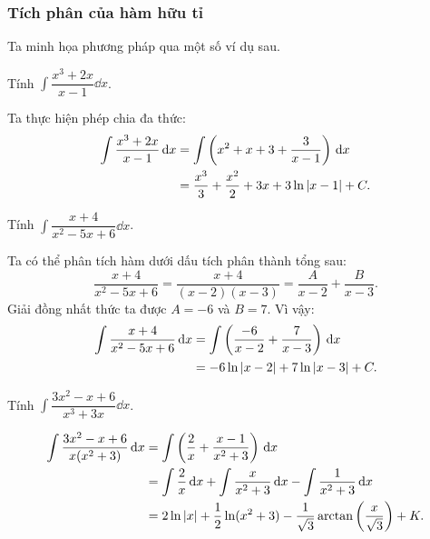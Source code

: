 \subsubsection{Tích phân của hàm hữu tỉ}
Ta minh họa phương pháp qua một số ví dụ sau.

\begin{example}
    Tính $\int \dfrac{x^3+2x}{x-1} \dd x$.
\end{example}
\begin{solution}
    Ta thực hiện phép chia đa thức:
    \begin{align*}
        \int \dfrac{x^3+2x}{x-1} \,\mathrm{d} x &= \int \left(x^2 + x + 3 + \dfrac{3}{x-1}\right) \,\mathrm{d} x \\
        &= \dfrac{x^3}{3} + \dfrac{x^2}{2} + 3x + 3\ln\left\lvert x-1 \right\rvert + C.
    \end{align*}
\end{solution}

\begin{example}
    Tính $\int \dfrac{x+4}{x^2 - 5x + 6} \dd x$.
\end{example}
\begin{solution}
    Ta có thể phân tích hàm dưới dấu tích phân thành tổng sau:
    \[
        \dfrac{x+4}{x^2 - 5x + 6} = \dfrac{x+4}{(x-2)(x-3)} = \dfrac{A}{x-2} + \dfrac{B}{x-3}.
    \]
    Giải đồng nhất thức ta được $A = -6$ và $B = 7$. Vì vậy:
    \begin{align*}
        \int \dfrac{x+4}{x^2 - 5x + 6} \,\mathrm{d} x &= \int \left( \dfrac{-6}{x-2} + \dfrac{7}{x-3} \right) \,\mathrm{d} x \\
        &= -6\ln\left\lvert x-2 \right\rvert + 7\ln\left\lvert x-3 \right\rvert + C.
    \end{align*}
\end{solution}

\begin{example}
    Tính $\int \dfrac{3x^2-x+6}{x^3+3x} \dd x$.
\end{example}
\begin{solution}
    \begin{align*}
        \int \dfrac{3x^2-x+6}{x(x^2+3)} \,\mathrm{d} x &= \int \left( \dfrac{2}{x} + \dfrac{x-1}{x^2+3} \right) \,\mathrm{d} x \\
        &= \int \dfrac{2}{x} \,\mathrm{d} x + \int \dfrac{x}{x^2+3} \,\mathrm{d} x - \int \dfrac{1}{x^2+3} \,\mathrm{d} x \\
        &= 2\ln\left\lvert x \right\rvert + \dfrac{1}{2}\ln(x^2+3) - \dfrac{1}{\sqrt{3}}\arctan\left(\dfrac{x}{\sqrt{3}}\right) + K.
    \end{align*}
\end{solution}

